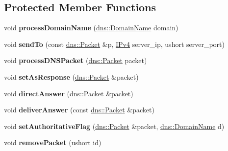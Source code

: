 \subsection*{Protected Member Functions}
\begin{DoxyCompactItemize}
\item 
void {\bfseries process\+Domain\+Name} (\hyperlink{structdns_1_1DomainName}{dns\+::\+Domain\+Name} domain)\hypertarget{classdns__server_ade0acda9d6fc57e25a7a52645101c753}{}\label{classdns__server_ade0acda9d6fc57e25a7a52645101c753}

\item 
void {\bfseries send\+To} (const \hyperlink{structdns_1_1Packet}{dns\+::\+Packet} \&p, \hyperlink{structIPv4}{I\+Pv4} server\+\_\+ip, ushort server\+\_\+port)\hypertarget{classdns__server_a0471cc529b817849b3910a6c8e415a86}{}\label{classdns__server_a0471cc529b817849b3910a6c8e415a86}

\item 
void {\bfseries process\+D\+N\+S\+Packet} (\hyperlink{structdns_1_1Packet}{dns\+::\+Packet} packet)\hypertarget{classdns__server_aedffffa660f9076ce9a5e2ee8de8602d}{}\label{classdns__server_aedffffa660f9076ce9a5e2ee8de8602d}

\item 
void {\bfseries set\+As\+Response} (\hyperlink{structdns_1_1Packet}{dns\+::\+Packet} \&packet)\hypertarget{classdns__server_aa05469d6b169567590aa23b64119e413}{}\label{classdns__server_aa05469d6b169567590aa23b64119e413}

\item 
void {\bfseries direct\+Answer} (\hyperlink{structdns_1_1Packet}{dns\+::\+Packet} \&packet)\hypertarget{classdns__server_a2ed1fc3068bf26f5932f3ba55cc7d374}{}\label{classdns__server_a2ed1fc3068bf26f5932f3ba55cc7d374}

\item 
void {\bfseries deliver\+Answer} (const \hyperlink{structdns_1_1Packet}{dns\+::\+Packet} \&packet)\hypertarget{classdns__server_ac0521c8ec9d0c0283bfcf1e53e1e5bcb}{}\label{classdns__server_ac0521c8ec9d0c0283bfcf1e53e1e5bcb}

\item 
void {\bfseries set\+Authoritative\+Flag} (\hyperlink{structdns_1_1Packet}{dns\+::\+Packet} \&packet, \hyperlink{structdns_1_1DomainName}{dns\+::\+Domain\+Name} d)\hypertarget{classdns__server_af6b289b84e5be96e9596193b06daf65f}{}\label{classdns__server_af6b289b84e5be96e9596193b06daf65f}

\item 
void {\bfseries remove\+Packet} (ushort id)\hypertarget{classdns__server_a29ce34ee3c497ba383b1651498500b12}{}\label{classdns__server_a29ce34ee3c497ba383b1651498500b12}


\end{DoxyCompactItemize}
